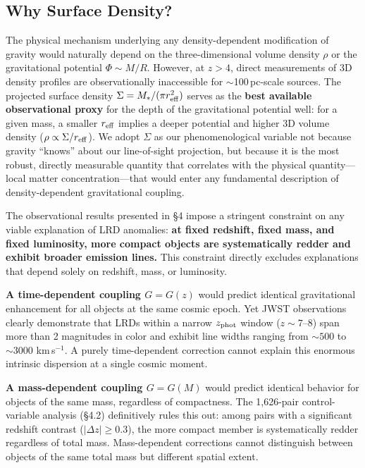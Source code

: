 \documentclass[apj,twocolumn,longbibliography,linenumbers]{aastex701}
\begin{document}
\subsection{Why Surface Density?}

The physical mechanism underlying any density-dependent modification of gravity would naturally depend on the three-dimensional volume density $\rho$ or the gravitational potential $\Phi \sim M/R$. However, at $z > 4$, direct measurements of 3D density profiles are observationally inaccessible for $\sim$100\,pc-scale sources. The projected surface density $\Sigma = M_*/(\pi r_{\rm eff}^2)$ serves as the \textbf{best available observational proxy} for the depth of the gravitational potential well: for a given mass, a smaller $r_{\rm eff}$ implies a deeper potential and higher 3D volume density ($\rho \propto \Sigma / r_{\rm eff}$). We adopt $\Sigma$ as our phenomenological variable not because gravity ``knows'' about our line-of-sight projection, but because it is the most robust, directly measurable quantity that correlates with the physical quantity---local matter concentration---that would enter any fundamental description of density-dependent gravitational coupling.

The observational results presented in \S4 impose a stringent constraint on any viable explanation of LRD anomalies: \textbf{at fixed redshift, fixed mass, and fixed luminosity, more compact objects are systematically redder and exhibit broader emission lines.} This constraint directly excludes explanations that depend solely on redshift, mass, or luminosity.

\textbf{A time-dependent coupling $G = G(z)$} would predict identical gravitational enhancement for all objects at the same cosmic epoch. Yet JWST observations clearly demonstrate that LRDs within a narrow $z_{\rm phot}$ window ($z \sim 7$--$8$) span more than 2 magnitudes in color and exhibit line widths ranging from ${\sim}500$ to ${\sim}3000$ km\,s$^{-1}$. A purely time-dependent correction cannot explain this enormous intrinsic dispersion at a single cosmic moment.

\textbf{A mass-dependent coupling $G = G(M)$} would predict identical behavior for objects of the same mass, regardless of compactness. The 1,626-pair control-variable analysis (\S4.2) definitively rules this out: among pairs with a significant redshift contrast ($|\Delta z| \geq 0.3$), the more compact member is systematically redder regardless of total mass. Mass-dependent corrections cannot distinguish between objects of the same total mass but different spatial extent.
\end{document}
